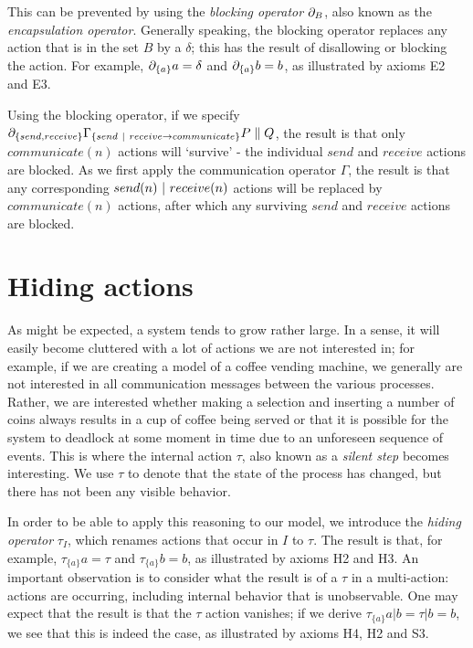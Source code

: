 This can be prevented by using the \emph{blocking operator} $\partial_{B}$, also known as the \emph{encapsulation operator}. Generally speaking, the blocking operator replaces any action that is in the set $B$ by a $\delta$; this has the result of disallowing or blocking the action. For example, $\partial_{ \{ a \} } a = \delta$ and $\partial_{ \{ a \} } b = b$, as illustrated by axioms E2 and E3.

Using the blocking operator, if we specify $\partial_{ \{ send, receive \} } \Gamma_{ \{ send ~|~ receive \rightarrow communicate \} } P \parallel Q$, the result is that only $communicate(n)$ actions will `survive' - the individual $send$ and $receive$ actions are blocked. As we first apply the communication operator $\Gamma$, the result is that any corresponding $send(n) ~|~ receive(n)$ actions will be replaced by $communicate(n)$ actions, after which any surviving $send$ and $receive$ actions are blocked.

\section{Hiding actions}

As might be expected, a system tends to grow rather large. In a sense, it will easily become cluttered with a lot of actions we are not interested in; for example, if we are creating a model of a coffee vending machine, we generally are not interested in all communication messages between the various processes. Rather, we are interested whether making a selection and inserting a number of coins always results in a cup of coffee being served or that it is possible for the system to deadlock at some moment in time due to an unforeseen sequence of events. This is where the internal action $\tau$, also known as a \emph{silent step} becomes interesting. We use $\tau$ to denote that the state of the process has changed, but there has not been any visible behavior.

In order to be able to apply this reasoning to our model, we introduce the \emph{hiding operator} $\tau_I$, which renames actions that occur in $I$ to $\tau$. The result is that, for example, $\tau_{\{ a \}} a = \tau$ and $\tau_{\{ a \} } b = b$, as illustrated by axioms H2 and H3. An important observation is to consider what the result is of a $\tau$ in a multi-action: actions are occurring, including internal behavior that is unobservable. One may expect that the result is that the $\tau$ action vanishes; if we derive $\tau_{ \{ a \} } a | b = \tau | b = b$, we see that this is indeed the case, as illustrated by axioms H4, H2 and S3.


